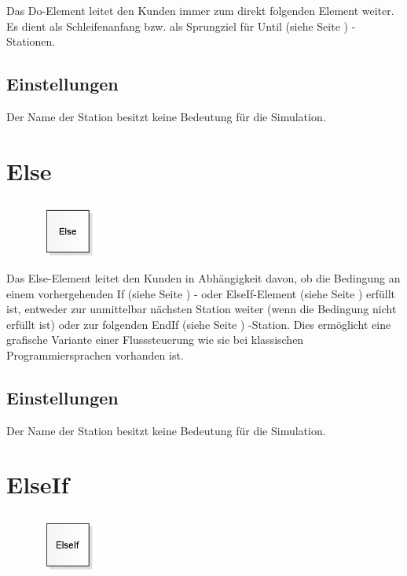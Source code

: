Das Do-Element leitet den Kunden immer zum direkt folgenden Element weiter.
Es dient als Schleifenanfang bzw. als Sprungziel für
Until (siehe Seite \pageref{ref:ModelElementLogicUntil}) -Stationen.

\subsection*{Einstellungen}

Der Name der Station besitzt keine Bedeutung für die Simulation.


\section{Else}
\label{ref:ModelElementLogicElse}

\begin{figure}
\vspace{-22pt}
\includegraphics[width=2cm]{imageModelElementLogicElse.png}
\vspace{-22pt}
\end{figure}

Das Else-Element leitet den Kunden in Abhängigkeit davon, ob die Bedingung an einem
vorhergehenden If (siehe Seite \pageref{ref:ModelElementLogicIf}) - oder
ElseIf-Element (siehe Seite \pageref{ref:ModelElementLogicElseIf}) erfüllt ist, entweder
zur unmittelbar nächsten Station weiter (wenn die Bedingung nicht erfüllt ist) oder
zur folgenden EndIf (siehe Seite \pageref{ref:ModelElementLogicEndIf}) -Station.
Dies ermöglicht eine grafische Variante einer Flusssteuerung wie sie bei
klassischen Programmiersprachen vorhanden ist.

\subsection*{Einstellungen}

Der Name der Station besitzt keine Bedeutung für die Simulation.


\section{ElseIf}
\label{ref:ModelElementLogicElseIf}

\begin{figure}
\vspace{-22pt}
\includegraphics[width=2cm]{imageModelElementLogicElseIf.png}
\vspace{-22pt}
\end{figure}

